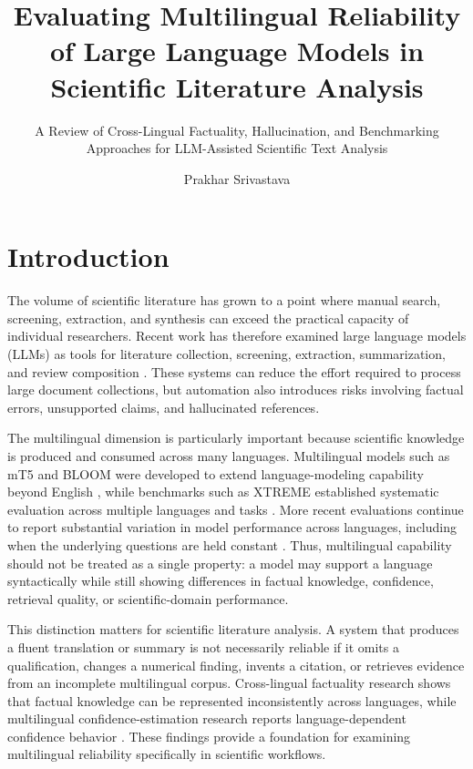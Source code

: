 \documentclass[acmsmall,screen,review]{acmart}
\title[Multilingual Reliability of LLMs]
{Evaluating Multilingual Reliability of Large Language Models in Scientific Literature Analysis}
\subtitle
{A Review of Cross-Lingual Factuality, Hallucination, and Benchmarking Approaches for LLM-Assisted Scientific Text Analysis}
\author{Prakhar Srivastava}
\affiliation{%
  \institution{Department of Information Technology, IIIT Allahabad}
  \country{India}
}
\begin{document}
\maketitle


\section{Introduction}
\label{sec:introduction}

The volume of scientific literature has grown to a point where manual search, screening, extraction, and synthesis can exceed the practical capacity of individual researchers. Recent work has therefore examined large language models (LLMs) as tools for literature collection, screening, extraction, summarization, and review composition \citep{scherbakov2025emergence,wu2025automated,tang2025automated}. These systems can reduce the effort required to process large document collections, but automation also introduces risks involving factual errors, unsupported claims, and hallucinated references.

The multilingual dimension is particularly important because scientific knowledge is produced and consumed across many languages. Multilingual models such as mT5 and BLOOM were developed to extend language-modeling capability beyond English \citep{xue2021mt5,bigscience2022bloom}, while benchmarks such as XTREME established systematic evaluation across multiple languages and tasks \citep{hu2020xtreme}. More recent evaluations continue to report substantial variation in model performance across languages, including when the underlying questions are held constant \citep{xuan2025mmlupro}. Thus, multilingual capability should not be treated as a single property: a model may support a language syntactically while still showing differences in factual knowledge, confidence, retrieval quality, or scientific-domain performance.

This distinction matters for scientific literature analysis. A system that produces a fluent translation or summary is not necessarily reliable if it omits a qualification, changes a numerical finding, invents a citation, or retrieves evidence from an incomplete multilingual corpus. Cross-lingual factuality research shows that factual knowledge can be represented inconsistently across languages, while multilingual confidence-estimation research reports language-dependent confidence behavior \citep{qi2023crosslingual,xue2024mlingconf}. These findings provide a foundation for examining multilingual reliability specifically in scientific workflows.
\end{document}
